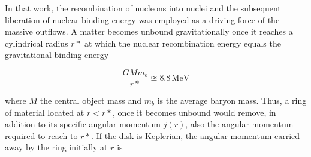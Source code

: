 %
%
%
In that work, the recombination of nucleons into nuclei and the subsequent 
liberation of nuclear binding energy was employed as a driving force 
of the massive outflows. A matter becomes unbound gravitationally 
once it reaches a cylindrical radius $r*$ at which the nuclear recombination energy 
equals the gravitational binding energy
\citep[\eg][]{Fernandez:2013tya}

\begin{equation*}
    \frac{G M m_b}{r*} \approxeq 8.8\, \text{MeV}
\end{equation*}

where $M$ the central object mass and $m_b$ is the average baryon mass.
Thus, a ring of material located at $r < r*$, once it becomes unbound
would remove, in addition to its specific angular
momentum $j(r)$, also the angular momentum required to reach
to $r*$. If the disk is Keplerian, the 
 angular momentum carried away by the ring initially at
$r$ is 

